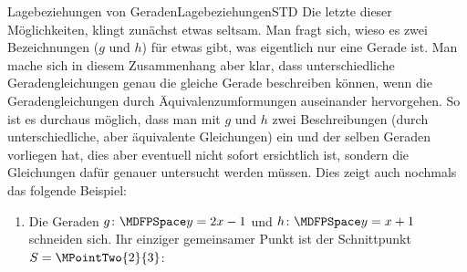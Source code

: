 \begin{MXContent}{Lagebeziehungen von Geraden}{Lagebeziehungen}{STD}
Die letzte dieser Möglichkeiten, klingt zunächst etwas seltsam. Man fragt sich, wieso es zwei Bezeichnungen ($g$ und $h$) für etwas gibt, was eigentlich nur eine Gerade ist. Man mache sich in diesem Zusammenhang aber klar, dass unterschiedliche Geradengleichungen genau die gleiche Gerade beschreiben können, wenn die Geradengleichungen durch Äquivalenzumformungen auseinander hervorgehen. So ist es durchaus möglich, dass man mit $g$ und $h$ zwei Beschreibungen (durch unterschiedliche, aber äquivalente Gleichungen) ein und der selben Geraden vorliegen hat, dies aber eventuell nicht sofort ersichtlich ist, sondern die Gleichungen dafür genauer untersucht werden müssen. Dies zeigt auch nochmals das folgende Beispiel:

\begin{MExample}
\begin{enumerate}
 \item Die Geraden $g\colon\MDFPSpace y=2x-1$ und $h\colon\MDFPSpace y=x+1$ schneiden sich. Ihr einziger gemeinsamer Punkt ist der Schnittpunkt $S=\MPointTwo{2}{3}$:
 \begin{center}
\end{center} 


\end{enumerate}
\end{MExample}
\end{MXContent}
